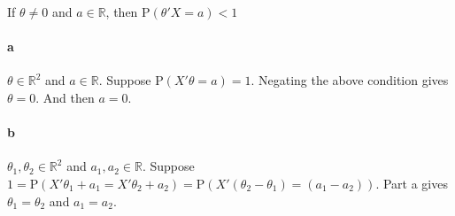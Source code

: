 \documentclass[11pt,letterpaper]{article}                  %
\begin{document}
\bigskip
\begin{problem}
If $\theta \neq 0$ and $a \in \mathbb{R}$, then
$\mathrm{P}(\theta' X = a) < 1$
\paragraph*{a}
$\theta \in \mathbb{R}^2$ and $a \in \mathbb{R}$. Suppose
$\mathrm{P}(X'\theta = a) = 1$. Negating the above condition gives
$\theta = 0$. And then $a = 0$.

\paragraph*{b}
$\theta_1,\theta_2 \in \mathbb{R}^2$ and $a_1,a_2 \in
\mathbb{R}$. Suppose $1 = \mathrm{P}(X'\theta_1 + a_1 = X'\theta_2 +
a_2) = \mathrm{P}\left(X'(\theta_2-\theta_1) = (a_1-a_2)\right)$. Part
a gives $\theta_1 = \theta_2$ and $a_1=a_2$.
\end{problem}
\end{document}
